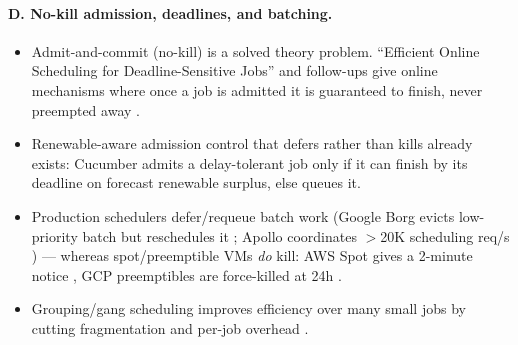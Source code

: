 \documentclass{article}
\begin{document}
\paragraph{D. No-kill admission, deadlines, and batching.}
\begin{itemize}
\item Admit-and-commit (no-kill) is a solved theory problem. ``Efficient Online
Scheduling for Deadline-Sensitive Jobs'' \cite{r40} and follow-ups give online
mechanisms where once a job is admitted it is guaranteed to finish, never preempted
away \cite{r41,r42}.
\item Renewable-aware admission control that defers rather than kills already exists:
Cucumber \cite{r39} admits a delay-tolerant job only if it can finish by its deadline
on forecast renewable surplus, else queues it.
\item Production schedulers defer/requeue batch work (Google Borg evicts low-priority
batch but reschedules it \cite{r43}; Apollo coordinates $>$20K scheduling req/s
\cite{r44}) --- whereas spot/preemptible VMs \emph{do} kill: AWS Spot gives a 2-minute
notice \cite{r27}, GCP preemptibles are force-killed at 24h \cite{r46}.
\item Grouping/gang scheduling improves efficiency over many small jobs by cutting
fragmentation and per-job overhead \cite{r45}.
\end{itemize}
\end{document}
